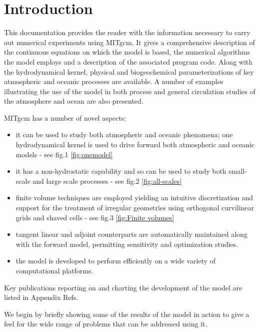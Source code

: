 
\section{Introduction}

This documentation provides the reader with the information necessary to
carry out numerical experiments using MITgcm. It gives a comprehensive
description of the continuous equations on which the model is based, the
numerical algorithms the model employs and a description of the associated
program code. Along with the hydrodynamical kernel, physical and
biogeochemical parameterizations of key atmospheric and oceanic processes
are available. A number of examples illustrating the use of the model in
both process and general circulation studies of the atmosphere and ocean are
also presented.

MITgcm has a number of novel aspects:

\begin{itemize}
\item  it can be used to study both atmospheric and oceanic phenomena; one
hydrodynamical kernel is used to drive forward both atmospheric and oceanic
models - see fig.1
\ref{fig:onemodel}

\item  it has a non-hydrostatic capability and so can be used to study both
small-scale and large scale processes - see fig.2
\ref{fig:all-scales}

\item  finite volume techniques are employed yielding an intuitive
discretization and support for the treatment of irregular geometries using
orthogonal curvilinear grids and shaved cells - see fig.3
\ref{fig:Finite volumes}

\item  tangent linear and adjoint counterparts are automatically maintained
along with the forward model, permitting sensitivity and optimization
studies.

\item  the model is developed to perform efficiently on a wide variety of
computational platforms.
\end{itemize}

Key publications reporting on and charting the development of the model are
listed in Appendix Refs.

We begin by briefly showing some of the results of the model in action to
give a feel for the wide range of problems that can be addressed using it.
